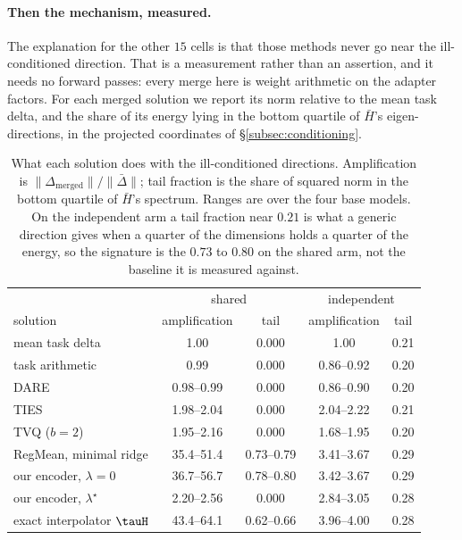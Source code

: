 \paragraph{Then the mechanism, measured.} The explanation for the other
$15$ cells is that those methods never go near the ill-conditioned
direction. That is a measurement rather than an assertion, and it needs no
forward passes: every merge here is weight
arithmetic on the adapter factors. For each merged solution we report its
norm relative to the mean task delta, and the share of its energy lying in
the bottom quartile of $\bar H$'s eigen-directions, in the projected
coordinates of \S\ref{subsec:conditioning}.

\begin{table}[t]
\centering
\small
\caption{What each solution does with the ill-conditioned directions.
Amplification is $\|\Delta_{\mathrm{merged}}\|/\|\bar\Delta\|$; tail
fraction is the share of squared norm in the bottom quartile of $\bar H$'s
spectrum. Ranges are over the four base models. On the independent arm a
tail fraction near $0.21$ is what a generic direction gives when a quarter
of the dimensions holds a quarter of the energy, so the signature is the
$0.73$ to $0.80$ on the shared arm, not the baseline it is measured
against.}
\label{tab:mechanism}
\begin{tabular}{lcccc}
\toprule
 & \multicolumn{2}{c}{shared} & \multicolumn{2}{c}{independent} \\
solution & amplification & tail & amplification & tail \\
\midrule
mean task delta            & 1.00 & 0.000 & 1.00 & 0.21 \\
task arithmetic            & 0.99 & 0.000 & 0.86--0.92 & 0.20 \\
DARE                       & 0.98--0.99 & 0.000 & 0.86--0.90 & 0.20 \\
TIES                       & 1.98--2.04 & 0.000 & 2.04--2.22 & 0.21 \\
TVQ ($b{=}2$)              & 1.95--2.16 & 0.000 & 1.68--1.95 & 0.20 \\
\addlinespace
RegMean, minimal ridge     & 35.4--51.4 & 0.73--0.79 & 3.41--3.67 & 0.29 \\
our encoder, $\lambda = 0$ & 36.7--56.7 & 0.78--0.80 & 3.42--3.67 & 0.29 \\
our encoder, $\lambda^\star$ & 2.20--2.56 & 0.000 & 2.84--3.05 & 0.28 \\
\addlinespace
exact interpolator $\tauH$ & 43.4--64.1 & 0.62--0.66 & 3.96--4.00 & 0.28 \\
\bottomrule
\end{tabular}
\end{table}

